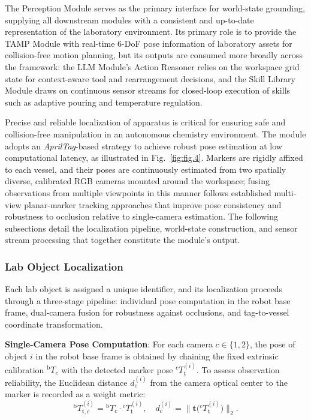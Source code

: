 \documentclass{ieeeaccess}
\begin{document}
The Perception Module serves as the primary interface for world-state grounding, supplying all downstream modules with a consistent and up-to-date representation of the laboratory environment. Its primary role is to provide the TAMP Module with real-time 6-DoF pose information of laboratory assets for collision-free motion planning, but its outputs are consumed more broadly across the framework: the LLM Module's Action Reasoner relies on the workspace grid state for context-aware tool and rearrangement decisions, and the Skill Library Module draws on continuous sensor streams for closed-loop execution of skills such as adaptive pouring and temperature regulation.

Precise and reliable localization of apparatus is critical for ensuring safe and collision-free manipulation in an autonomous chemistry environment. The module adopts an \textit{AprilTag}-based strategy \cite{wang2016apriltag} to achieve robust pose estimation at low computational latency, as illustrated in Fig.~\ref{fig:fig.4}. Markers are rigidly affixed to each vessel, and their poses are continuously estimated from two spatially diverse, calibrated RGB cameras mounted around the workspace; fusing observations from multiple viewpoints in this manner follows established multi-view planar-marker tracking approaches \cite{sarmadi2019simultaneous} that improve pose consistency and robustness to occlusion relative to single-camera estimation. The following subsections detail the localization pipeline, world-state construction, and sensor stream processing that together constitute the module's output.


\subsubsection{Lab Object Localization}\label{sec:3.3.1}
Each lab object is assigned a unique identifier, and its localization proceeds through a three-stage pipeline: individual pose computation in the robot base frame, dual-camera fusion for robustness against occlusions, and tag-to-vessel coordinate transformation.

\textbf{Single-Camera Pose Computation}: For each camera $c \in \{1, 2\}$, the pose of object $i$ in the robot base frame is obtained by chaining the fixed extrinsic calibration ${}^{\text{b}}T_{c}$ with the detected marker pose ${}^{c}T_{\text{t}}^{(i)}$. To assess observation reliability, the Euclidean distance $d_c^{(i)}$ from the camera optical center to the marker is recorded as a weight metric:
\begin{equation}
    {}^{\text{b}}T_{\text{t},c}^{(i)} = {}^{\text{b}}T_{c} \cdot {}^{c}T_{\text{t}}^{(i)}, \quad
    d_c^{(i)} = \bigl\|\mathbf{t}\bigl({}^{c}T_{\text{t}}^{(i)}\bigr)\bigr\|_2.
\end{equation}
\end{document}
